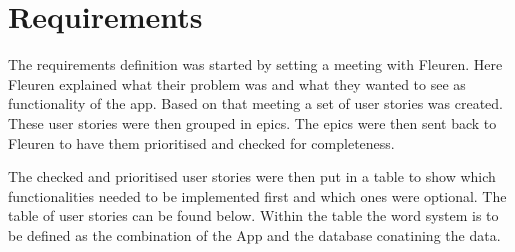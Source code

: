 \section{Requirements\label{sec:Requirements}}
The requirements definition was started by setting a meeting with Fleuren. Here Fleuren explained what their problem was and what they wanted to see as functionality of the app. Based on that meeting a set of user stories was created. These user stories were then grouped in epics. The epics were then sent back to Fleuren to have them prioritised and checked for completeness.

The checked and prioritised user stories were then put in a table to show which functionalities needed to be implemented first and which ones were optional. The table of user stories can be found below. Within the table the word system is to be defined as the combination of the App and the database conatining the data.

